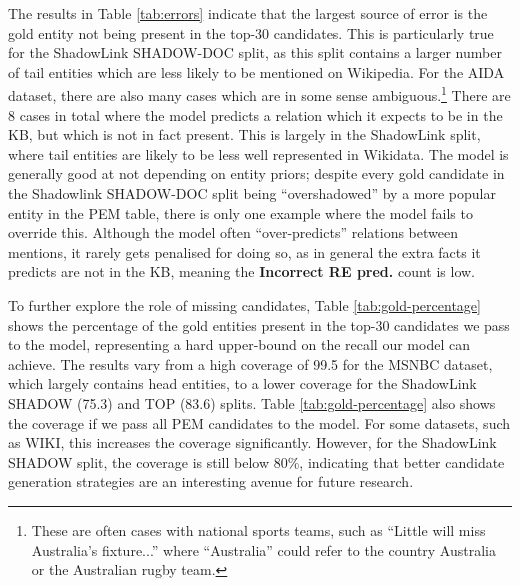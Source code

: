 \documentclass[11pt]{article}
\begin{document}
The results in Table \ref{tab:errors} indicate that the largest source of error is the gold entity not being present in the top-30 candidates. This is particularly true for the ShadowLink {SHADOW-DOC} split, as this split contains a larger number of tail entities which are less likely to be mentioned on Wikipedia. For the AIDA dataset, there are also many cases which are in some sense ambiguous.\footnote{These are often cases with national sports teams, such as ``Little will miss Australia's fixture...'' where ``Australia'' could refer to the country Australia or the Australian rugby team.} There are 8 cases in total where the model predicts a relation which it expects to be in the KB, but which is not in fact present. This is largely in the ShadowLink split, where tail entities are likely to be less well represented in Wikidata. The model is generally good at not depending on entity priors; despite every gold candidate in the Shadowlink SHADOW-DOC split being ``overshadowed'' by a more popular entity in the PEM table, there is only one example where the model fails to override this. Although the model often ``over-predicts'' relations between mentions, it rarely gets penalised for doing so, as in general the extra facts it predicts are not in the KB, meaning the \textbf{Incorrect RE pred.} count is low.

To further explore the role of missing candidates, Table \ref{tab:gold-percentage} shows the percentage of the gold entities present in the top-30 candidates we pass to the model, representing a hard upper-bound on the recall our model can achieve. The results vary from a high coverage of 99.5 for the MSNBC dataset, which largely contains head entities, to a lower coverage for the ShadowLink SHADOW (75.3) and TOP (83.6) splits. Table \ref{tab:gold-percentage} also shows the coverage if we pass all PEM candidates to the model. For some datasets, such as WIKI, this increases the coverage significantly. However, for the ShadowLink SHADOW split, the coverage is still below 80\%, indicating that better candidate generation strategies are an interesting avenue for future research. 
\end{document}
